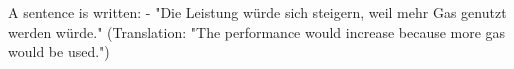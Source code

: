 A sentence is written:  
- "Die Leistung würde sich steigern, weil mehr Gas genutzt werden würde."  
(Translation: "The performance would increase because more gas would be used.")